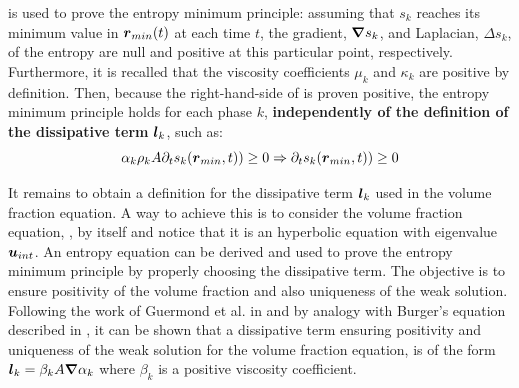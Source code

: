 %
 is used to prove the entropy minimum principle: assuming that $s_k$ reaches its minimum value in $\boldsymbol r_{min}(t)$ at each time $t$, the gradient, $\boldsymbol{\nabla} s_k$, and Laplacian, $\Delta s_k$,  of the entropy are null and positive at this particular point, respectively. Furthermore, it is recalled that the viscosity coefficients $\mu_k$ and $\kappa_k$ are positive by definition. Then, because the right-hand-side of  is proven positive, the entropy minimum principle holds for each phase $k$, \textbf{independently of the definition of the dissipative term} $\boldsymbol l_k$, such as:
%
\begin{equation}\label{eq:ent-res-7-eqn-diss-terms4}
\alpha_k \rho_k A \partial_t s_k(\boldsymbol r_{min},t)) \geq 0 \Rightarrow \partial_t s_k(\boldsymbol r_{min},t)) \geq 0 \nonumber
\end{equation}
%

It remains to obtain a definition for the
dissipative term $\boldsymbol l_k$ used in the volume fraction equation. A way to achieve this is to
consider the volume fraction equation, , by itself and notice that it is an hyperbolic equation
with eigenvalue $\boldsymbol u_{int}$. An entropy equation can be derived and used to prove the
entropy minimum principle by properly choosing the dissipative term. The objective is to
ensure positivity of the volume fraction and also uniqueness of the weak solution. Following
the work of Guermond et al. in \cite{jlg1, jlg2} and by analogy
with Burger's equation described in , it can be shown that a dissipative term ensuring positivity and
uniqueness of the weak solution for the volume fraction equation, is of the form $\boldsymbol l_k = \beta_k A \boldsymbol{\nabla} \alpha_k $ where $\beta_k$
is a positive viscosity coefficient.

